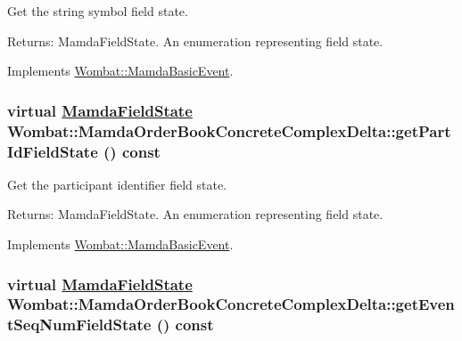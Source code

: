 Get the string symbol field state. 

\begin{Desc}
\item[Returns:]Mamda\-Field\-State. An enumeration representing field state. \end{Desc}


Implements \hyperlink{classWombat_1_1MamdaBasicEvent_ef95e19f4babb0e5ea8549d6cf29d13f}{Wombat::Mamda\-Basic\-Event}.\hypertarget{classWombat_1_1MamdaOrderBookConcreteComplexDelta_42ee7ffbc3efc20b27e6d2c8bd608be3}{
\subsubsection[getPartIdFieldState]{\setlength{\rightskip}{0pt plus 5cm}virtual \hyperlink{namespaceWombat_93aac974f2ab713554fd12a1fa3b7d2a}{Mamda\-Field\-State} Wombat::Mamda\-Order\-Book\-Concrete\-Complex\-Delta::get\-Part\-Id\-Field\-State () const}}
\label{classWombat_1_1MamdaOrderBookConcreteComplexDelta_42ee7ffbc3efc20b27e6d2c8bd608be3}


Get the participant identifier field state. 

\begin{Desc}
\item[Returns:]Mamda\-Field\-State. An enumeration representing field state. \end{Desc}


Implements \hyperlink{classWombat_1_1MamdaBasicEvent_c361c99af2cf7eb9f5621d89f744fc62}{Wombat::Mamda\-Basic\-Event}.\hypertarget{classWombat_1_1MamdaOrderBookConcreteComplexDelta_a9b3bc0a4df49141cda98f802d2372f6}{
\subsubsection[getEventSeqNumFieldState]{\setlength{\rightskip}{0pt plus 5cm}virtual \hyperlink{namespaceWombat_93aac974f2ab713554fd12a1fa3b7d2a}{Mamda\-Field\-State} Wombat::Mamda\-Order\-Book\-Concrete\-Complex\-Delta::get\-Event\-Seq\-Num\-Field\-State () const}}
\label{classWombat_1_1MamdaOrderBookConcreteComplexDelta_a9b3bc0a4df49141cda98f802d2372f6}


